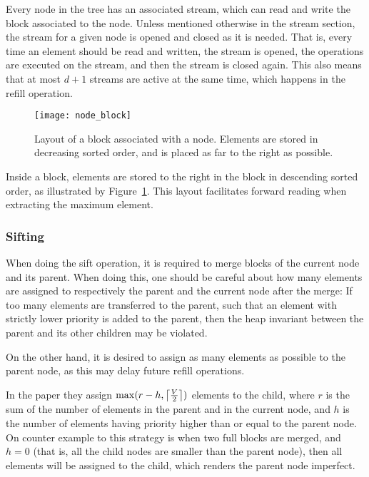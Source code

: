 Every node in the tree has an associated stream, which can read and
write the block associated to the node. Unless mentioned otherwise
in the stream section, the stream for a given node is opened and
closed as it is needed. That is, every time an element should be read
and written, the stream is opened, the operations are executed on the
stream, and then the stream is closed again. This also means that at
most $d + 1$ streams are active at the same time, which happens in
the refill operation.

\begin{figure}
  \centering
  \texttt{[image: node\_block]}
  \caption{Layout of a block associated with a node. Elements are
    stored in decreasing sorted order, and is placed as far to the
    right as possible.}
  \label{fig:node-block}
\end{figure}

Inside a block, elements are stored to the right in the block in
descending sorted order, as illustrated by
Figure~\ref{fig:node-block}. This layout facilitates forward reading
when extracting the maximum element.

\subsubsection{Sifting}
\label{sec:heap:sifting}
When doing the sift operation, it is required to merge blocks of the
current node and its parent. When doing this, one should be careful
about how many elements are assigned to respectively the parent and
the current node after the merge: If too many elements are transferred
to the parent, such that an element with strictly lower priority is
added to the parent, then the heap invariant between the parent and
its other children may be violated.

On the other hand, it is desired to assign as many elements as
possible to the parent node, as this may delay future refill
operations.

In the paper they assign $\max(r - h, \ceil*{\frac{V}{2}})$ elements to
the child, where $r$ is the sum of the number of elements in the
parent and in the current node, and $h$ is the number of elements
having priority higher than or equal to the parent node. On counter
example to this strategy is when two full blocks are merged, and $h =
0$ (that is, all the child nodes are smaller than the parent node),
then all elements will be assigned to the child, which renders the
parent node imperfect.


